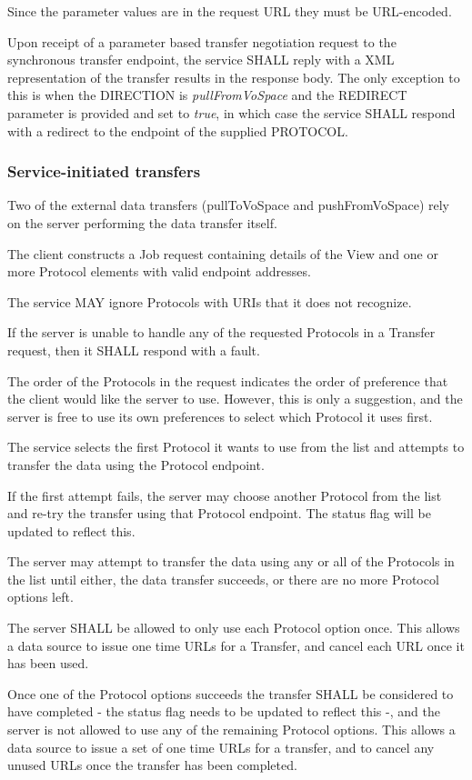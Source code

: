 \documentclass[11pt,a4paper]{ivoa}
\begin{document}
Since the parameter values are in the request URL they must be URL-encoded.

Upon receipt of a parameter based transfer negotiation request to the synchronous transfer endpoint, the service SHALL reply with a XML representation of the transfer results in the response body.  The only exception to this is when the DIRECTION is \emph{pullFromVoSpace} and the REDIRECT parameter is provided and set to \emph{true}, in which case the service SHALL respond with a redirect to the endpoint of the supplied PROTOCOL.

\subsubsection{Service-initiated transfers}
\label{subsubsec:service-initiated transfers}
Two of the external data transfers (pullToVoSpace and pushFromVoSpace) rely on the server performing the data transfer itself.

The client constructs a Job request containing details of the View and one or more Protocol elements with valid endpoint addresses.

The service MAY ignore Protocols with URIs that it does not recognize.

If the server is unable to handle any of the requested Protocols in a Transfer request, then it SHALL respond with a fault.

The order of the Protocols in the request indicates the order of preference that the client would like the server to use. However, this is only a suggestion, and the server is free to use its own preferences to select which Protocol it uses first.

The service selects the first Protocol it wants to use from the list and attempts to transfer the data using the Protocol endpoint.

If the first attempt fails, the server may choose another Protocol from the list and re-try the transfer using that Protocol endpoint. The status flag will be updated to reflect this.

The server may attempt to transfer the data using any or all of the Protocols in the list until either, the data transfer succeeds, or there are no more Protocol options left.

The server SHALL be allowed to only use each Protocol option once. This allows a data source to issue one time URLs for a Transfer, and cancel each URL once it has been used.

Once one of the Protocol options succeeds the transfer SHALL be considered to have completed - the status flag needs to be updated to reflect this -, and the server is not allowed to use any of the remaining Protocol options. This allows a data source to issue a set of one time URLs for a transfer, and to cancel any unused URLs once the transfer has been completed.
\end{document}
